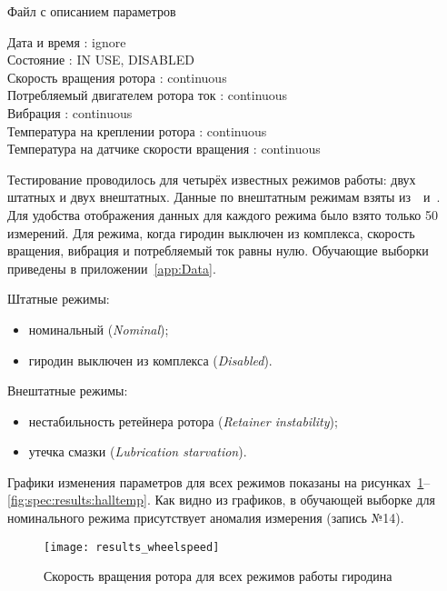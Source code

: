 \begin{algorithm}[h]
\caption{Файл с описанием параметров}
\label{lst:spec:results:params}
\raggedright
\addtolength{\leftskip}{5mm}
\smallskip
Дата и время : ignore \\
Состояние : IN USE, DISABLED \\
Скорость вращения ротора : continuous \\
Потребляемый двигателем ротора ток : continuous \\
Вибрация : continuous \\
Температура на креплении ротора : continuous \\
Температура на датчике скорости вращения : continuous \\
\end{algorithm}

Тестирование проводилось для четырёх известных режимов работы: двух штатных и двух внештатных. Данные по внештатным режимам взяты из~\cite{ISSCMGFailureAnalysis}~и~\cite{ISSCMGLessonsLearned}. Для удобства отображения данных для каждого режима было взято только 50 измерений. Для режима, когда гиродин выключен из комплекса, скорость вращения, вибрация и потребляемый ток равны нулю. Обучающие выборки приведены в приложении~\ref{app:Data}.

Штатные режимы:
\begin{itemize}
	\item номинальный (\textit{Nominal});
	\item гиродин выключен из комплекса (\textit{Disabled}).
\end{itemize}

Внештатные режимы:
\begin{itemize}
	\item нестабильность ретейнера ротора (\textit{Retainer instability});
	\item утечка смазки (\textit{Lubrication starvation}).
\end{itemize}

Графики изменения параметров для всех режимов показаны на рисунках~\ref{fig:spec:results:wheelspeed}--\ref{fig:spec:results:halltemp}. Как видно из графиков, в обучающей выборке для номинального режима присутствует аномалия измерения (запись №14).

\begin{figure}[h]
\texttt{[image: results\_wheelspeed]}
\caption{Скорость вращения ротора для всех режимов работы гиродина}
\label{fig:spec:results:wheelspeed}
\end{figure}


